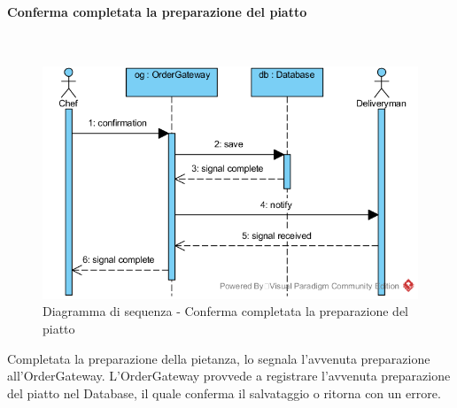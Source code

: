 \begin{samepage}
\paragraph{Conferma completata la preparazione del piatto}\mbox{}\\
\end{samepage}
\begin{figure}[H]
	\centering
	\includegraphics[width=14cm]{diagrammi_img/sequenza/cuoco_piatto_pronto.png}
	\caption{Diagramma di sequenza - Conferma completata la preparazione del piatto}
\end{figure}
Completata la preparazione della pietanza, lo \Chef{} segnala l'avvenuta preparazione all'Order\-Gateway. L'Order\-Gateway provvede a registrare l'avvenuta preparazione del piatto nel Database, il quale conferma il salvataggio o ritorna con un errore.


\subsubsection{\Deliveryman{}}

